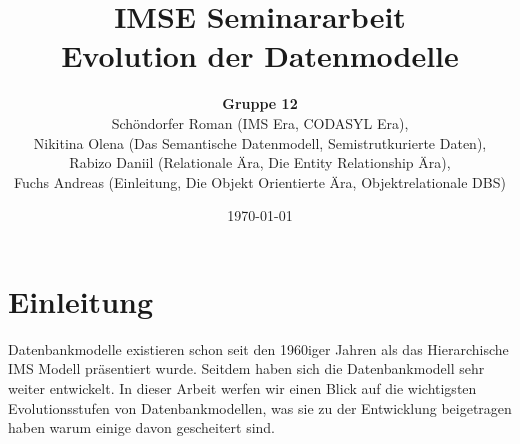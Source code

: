 \documentclass[a4paper]{article}
\title{\textbf{IMSE Seminararbeit}\\
Evolution der Datenmodelle}
\author{\textbf{Gruppe 12}\\
	Schöndorfer Roman \small{(IMS Era, CODASYL Era)}, \\
	Nikitina Olena \small{(Das Semantische Datenmodell, Semistrutkurierte Daten)}, \\
	Rabizo Daniil \small{(Relationale Ära, Die Entity Relationship Ära)}, \\
	Fuchs Andreas \small{(Einleitung, Die Objekt Orientierte Ära, Objektrelationale DBS)}
}
\date{\today}
\begin{document}
\maketitle
\newpage
\tableofcontents
\newpage



\section{Einleitung}
Datenbankmodelle existieren schon seit den 1960iger Jahren als das Hierarchische IMS Modell präsentiert wurde. Seitdem haben sich die Datenbankmodell sehr weiter entwickelt. In dieser Arbeit werfen wir einen Blick auf die wichtigsten Evolutionsstufen von Datenbankmodellen, was sie zu der Entwicklung beigetragen haben warum einige davon gescheitert sind.


%





{}


\end{document}
